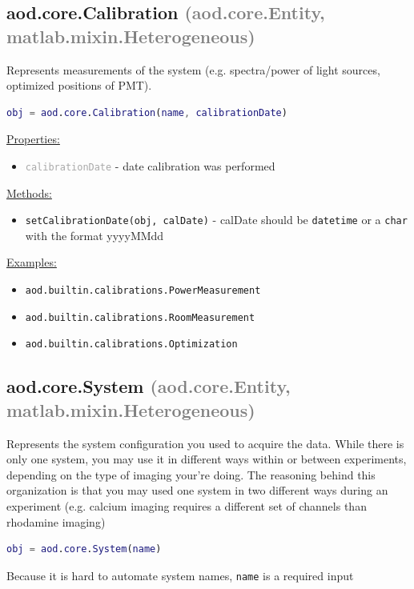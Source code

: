 \documentclass[10pt]{exam}
\newcommand\myparent[1]{\textcolor{gray}{(#1)}}
\newcommand\aodclass[1]{\textcolor{codeblue}{\texttt{#1}}}
\newcommand\aodprop[1]{\textcolor{darkgray}{\texttt{#1}}}
\newcommand\aodfcn[1]{\textcolor{darkteal}{\texttt{#1}}}
\newcommand\docheader[1]{\vspace{0.6ex}\noindent\underline{#1}\vspace{0.15ex}}
\begin{document}
	\subsection{aod.core.Calibration \myparent{aod.core.Entity, matlab.mixin.Heterogeneous}}
		\label{subsection:CalibrationDoc}
		\noindent Represents measurements of the system (e.g. spectra/power of light sources, optimized positions of PMT). %
	
		\begin{lstlisting}[language=matlab]
obj = aod.core.Calibration(name, calibrationDate)
		\end{lstlisting}
		\docheader{Properties:}
		\begin{itemize}
			\item \aodprop{calibrationDate} - date calibration was performed
		\end{itemize}
		\docheader{Methods:}
		\begin{itemize}
			\item \aodfcn{setCalibrationDate(obj, calDate)} - calDate should be \aodclass{datetime} or a \aodclass{char} with the format yyyyMMdd
		\end{itemize}
		\docheader{Examples:}
		\begin{itemize}
			\item \aodclass{aod.builtin.calibrations.PowerMeasurement}
			\item \aodclass{aod.builtin.calibrations.RoomMeasurement}
			\item \aodclass{aod.builtin.calibrations.Optimization}
		\end{itemize}
	\subsection{aod.core.System \myparent{aod.core.Entity, matlab.mixin.Heterogeneous}}
		\label{subsection:SystemDoc}
		\noindent Represents the system configuration you used to acquire the data. While there is only one system, you may use it in different ways within or between experiments, depending on the type of imaging your're doing. The reasoning behind this organization is that you may used one system in two different ways during an experiment (e.g. calcium imaging requires a different set of channels than rhodamine imaging)
	
		\begin{lstlisting}[language=matlab]
obj = aod.core.System(name)
		\end{lstlisting}
		\noindent Because it is hard to automate system names, \texttt{name} is a required input
		
\end{document}
